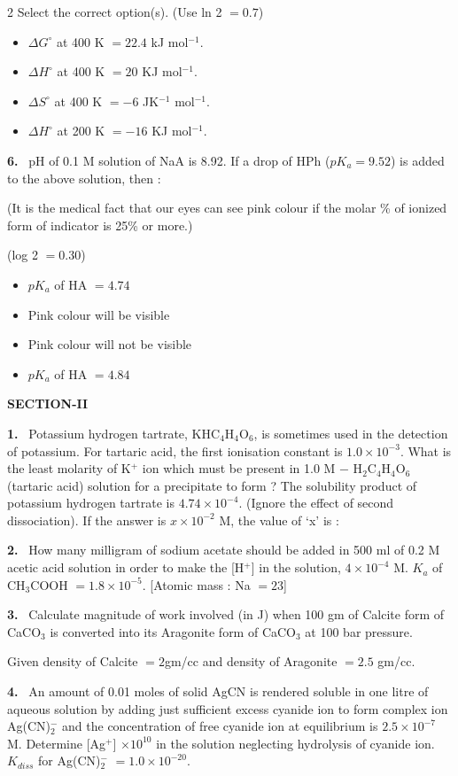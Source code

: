 \documentclass[10pt]{extarticle}
\newcommand{\sect}[1]{\par\smallskip\noindent\textbf{#1}\par}
\newcommand{\qn}[1]{\par\smallskip\noindent\textbf{#1.}~}
\newenvironment{qoptions}{\begin{itemize}[leftmargin=1.8em,itemsep=1pt,topsep=2pt,label={}]}{\end{itemize}}
\newcommand{\opt}[2]{\item[(#1)] #2}
\begin{document}
\begin{multicols}{2}
Select the correct option(s). (Use ln 2 $=0.7$)\par
[Given : $C_P$(AB, g) $=40$ JK$^{-1}$ mol$^{-1}$, $C_P$(A$_2$, g) $=25$ JK$^{-1}$ mol$^{-1}$, $C_P$(B$_2$, g) $=35$ JK$^{-1}$ mol$^{-1}$]
\begin{qoptions}
\opt{A}{$\Delta G^\circ$ at 400 K $=22.4$ kJ mol$^{-1}$.}
\opt{B}{$\Delta H^\circ$ at 400 K $=20$ KJ mol$^{-1}$.}
\opt{C}{$\Delta S^\circ$ at 400 K $=-6$ JK$^{-1}$ mol$^{-1}$.}
\opt{D}{$\Delta H^\circ$ at 200 K $=-16$ KJ mol$^{-1}$.}
\end{qoptions}
\qn{6} pH of 0.1 M solution of NaA is 8.92. If a drop of HPh ($pK_a=9.52$) is added to the above solution, then :\par
(It is the medical fact that our eyes can see pink colour if the molar \% of ionized form of indicator is 25\% or more.)\par
(log 2 $=0.30$)
\begin{qoptions}
\opt{A}{$pK_a$ of HA $=4.74$}
\opt{B}{Pink colour will be visible}
\opt{C}{Pink colour will not be visible}
\opt{D}{$pK_a$ of HA $=4.84$}
\end{qoptions}
\sect{SECTION-II}
\qn{1} Potassium hydrogen tartrate, KHC$_4$H$_4$O$_6$, is sometimes used in the detection of potassium. For tartaric acid, the first ionisation constant is $1.0\times10^{-3}$. What is the least molarity of K$^+$ ion which must be present in 1.0 M $-$ H$_2$C$_4$H$_4$O$_6$ (tartaric acid) solution for a precipitate to form ? The solubility product of potassium hydrogen tartrate is $4.74\times10^{-4}$. (Ignore the effect of second dissociation). If the answer is $x\times10^{-2}$ M, the value of `x' is :\par
[Use $\sqrt{10}=3.16$]
\qn{2} How many milligram of sodium acetate should be added in 500 ml of 0.2 M acetic acid solution in order to make the [H$^+$] in the solution, $4\times10^{-4}$ M. $K_a$ of CH$_3$COOH $=1.8\times10^{-5}$. [Atomic mass : Na $=23$]
\qn{3} Calculate magnitude of work involved (in J) when 100 gm of Calcite form of CaCO$_3$ is converted into its Aragonite form of CaCO$_3$ at 100 bar pressure.\par
Given density of Calcite $=2$gm/cc and density of Aragonite $=2.5$ gm/cc.\par
[Atomic mass : Ca $=40$]
\qn{4} An amount of 0.01 moles of solid AgCN is rendered soluble in one litre of aqueous solution by adding just sufficient excess cyanide ion to form complex ion Ag(CN)$_2^-$ and the concentration of free cyanide ion at equilibrium is $2.5\times10^{-7}$ M. Determine [Ag$^+$] $\times10^{10}$ in the solution neglecting hydrolysis of cyanide ion. $K_{diss}$ for Ag(CN)$_2^-$ $=1.0\times10^{-20}$.

\end{multicols}
\end{document}
